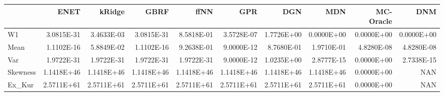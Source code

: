 \begin{tabular}{lrrrrrrrrr}
\toprule
{} &       ENET &     kRidge &       GBRF &       ffNN &        GPR &        DGN &        MDN &  MC-Oracle &        DNM \\
\midrule
W1       & 3.0815E-31 & 3.4633E-03 & 3.0815E-31 & 8.5818E-01 & 3.5728E-07 & 1.7726E+00 & 0.0000E+00 & 0.0000E+00 & 0.0000E+00 \\
Mean     & 1.1102E-16 & 5.8849E-02 & 1.1102E-16 & 9.2638E-01 & 9.0000E-12 & 8.7680E-01 & 1.9710E-01 & 4.8280E-08 & 4.8280E-08 \\
Var      & 1.9722E-31 & 1.9722E-31 & 1.9722E-31 & 1.9722E-31 & 9.0000E-12 & 1.0235E+00 & 2.8777E-15 & 0.0000E+00 & 2.7338E-15 \\
Skewness & 1.1418E+46 & 1.1418E+46 & 1.1418E+46 & 1.1418E+46 & 1.1418E+46 & 1.1418E+46 & 1.1418E+46 & 0.0000E+00 &        NAN \\
Ex\_Kur   & 2.5711E+61 & 2.5711E+61 & 2.5711E+61 & 2.5711E+61 & 2.5711E+61 & 2.5711E+61 & 2.5711E+61 & 0.0000E+00 &        NAN \\
\bottomrule
\end{tabular}
